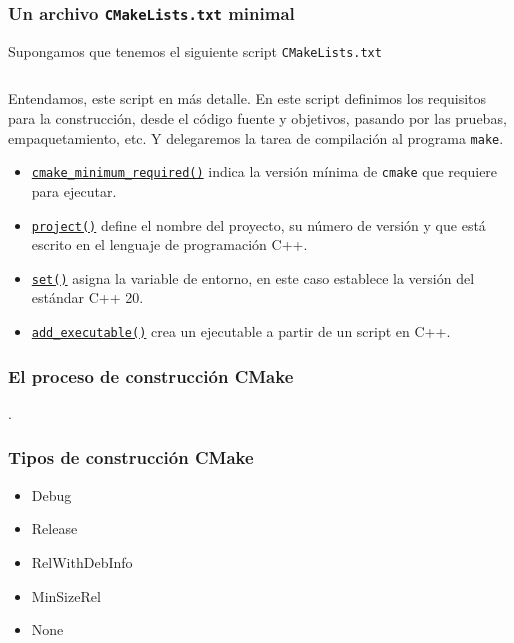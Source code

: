 \begin{frame}[fragile]
	\frametitle{Un archivo \lstinline{CMakeLists.txt} minimal}
	Supongamos que tenemos el siguiente script \lstinline{CMakeLists.txt}

	\inputminted{cmake}{CMakeList.txt.sample}

	Entendamos, este script en más detalle.
	En este script definimos los requisitos para la construcción, desde
	el código fuente y objetivos, pasando por las pruebas, empaquetamiento, etc.
	Y delegaremos la tarea de compilación al programa \lstinline{make}.

	\begin{itemize}
		\item

		\href{https://cmake.org/cmake/help/latest/command/cmake_minimum_required.html}{\lstinline{cmake_minimum_required()}}
		indica la versión mínima de \lstinline{cmake} que requiere para ejecutar.

		\item
		
		\href{https://cmake.org/cmake/help/latest/command/project.html}{\lstinline{project()}}
		define el nombre del proyecto, su número de versión y que
		está escrito en el lenguaje de programación C++.
		
		\item

		\href{https://cmake.org/cmake/help/latest/command/set.html}{\lstinline{set()}}
		asigna la variable de entorno, en este caso establece la versión del estándar C++ 20.

		\item

		\href{https://cmake.org/cmake/help/latest/command/add_executable.html}{\lstinline{add_executable()}}
		crea un ejecutable a partir de un script en C++.
	\end{itemize}
\end{frame}

\begin{frame}[fragile]
	\frametitle{El proceso de construcción CMake}
	.
\end{frame}

\begin{frame}[fragile]
	\frametitle{Tipos de construcción CMake}

	\begin{itemize}
		\item
		
		Debug

		\item
		
		Release

		\item
		
		RelWithDebInfo

		\item
		
		MinSizeRel

		\item
		
		None
	\end{itemize}
\end{frame}

